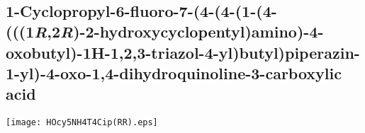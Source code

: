 \\[1\baselineskip]
\\[1\baselineskip]
\\[1\baselineskip]
\\[1\baselineskip]

\subsection{1\hyp{}Cyclopropyl\hyp{}6\hyp{}fluoro\hyp{}7\hyp{}(4\hyp{}(4\hyp{}(1\hyp{}(4\hyp{}(((1\textit{R},2\textit{R})\hyp{}2\hyp{}hydroxycyclopentyl)amino)\hyp{}4\hyp{}oxobutyl)\hyp{}1H\hyp{}1,2,3\hyp{}triazol\hyp{}4\hyp{}yl)butyl)piperazin\hyp{}1\hyp{}yl)\hyp{}4\hyp{}oxo\hyp{}1,4\hyp{}dihydroquinoline\hyp{}3\hyp{}carboxylic acid }


\begin{scheme}[H]
	\begin{center}
		\texttt{[image: HOcy5NH4T4Cip(RR).eps]}
	\end{center}
\end{scheme}

